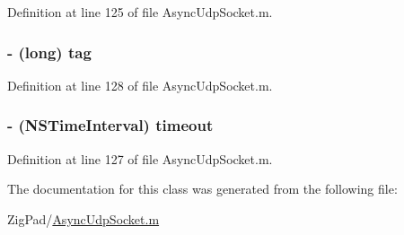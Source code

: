 Definition at line 125 of file AsyncUdpSocket.m.

\hypertarget{interface_async_send_packet_ae10c29173f0af40507d7e787905c7130}{
\subsubsection[{tag}]{\setlength{\rightskip}{0pt plus 5cm}-\/ (long) {\bf tag}}}
\label{interface_async_send_packet_ae10c29173f0af40507d7e787905c7130}


Definition at line 128 of file AsyncUdpSocket.m.

\hypertarget{interface_async_send_packet_a39233eb85b4cbae04411577510e7c5e6}{
\subsubsection[{timeout}]{\setlength{\rightskip}{0pt plus 5cm}-\/ (NSTimeInterval) {\bf timeout}}}
\label{interface_async_send_packet_a39233eb85b4cbae04411577510e7c5e6}


Definition at line 127 of file AsyncUdpSocket.m.



The documentation for this class was generated from the following file:\begin{DoxyCompactItemize}
\item 
ZigPad/\hyperlink{_async_udp_socket_8m}{AsyncUdpSocket.m}\end{DoxyCompactItemize}
